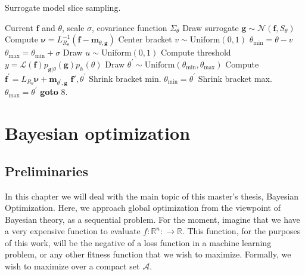\documentclass[10pt,a4paper,twoside]{book}
\begin{document}
\begin{algorithm}
	\caption{Surrogate model slice sampling.}
		\label{mh4alg}
		\begin{algorithmic}[1]
		\Require Current $\boldsymbol{f}$ and $\theta$, scale $\sigma$, covariance function $\Sigma_\theta$ 
		\State Draw surrogate $\boldsymbol{g} \sim \mathcal{N}(\boldsymbol{f}, S_\theta)$
		\State Compute $\boldsymbol{\nu} = L_{R_\theta}^{-1}(\boldsymbol{f} - \boldsymbol{m}_{\theta, \boldsymbol{g}})$
		\State Center bracket $v \sim \mathrm{Uniform}(0, 1)$
		\State $\theta_{\mathrm{min}} = \theta - v$
		\State $\theta_{\mathrm{max}} = \theta_{\mathrm{min}} + \sigma$
		\State Draw $u \sim \mathrm{Uniform}(0, 1)$
		\State Compute threshold $y = \mathcal{L}(\boldsymbol{f})p_{\boldsymbol{g}|\theta}(\boldsymbol{g})p_h(\theta)$
		\State Draw $\theta^{'} \sim \mathrm{Uniform}(\theta_{\mathrm{min}}, \theta_{\mathrm{max}})$
		\State Compute $\boldsymbol{f}^{'} = L_{R_{\theta}}\boldsymbol{\nu} + \boldsymbol{m}_{\theta^{'}, \boldsymbol{g}}$
		\Return $\boldsymbol{f'}, \theta^{'}$
		\State Shrink bracket min. $\theta_{\mathrm{min}} = \theta^{'}$
		\Else
		\State Shrink bracket max. $\theta_{\mathrm{max}} = \theta^{'}$
		\EndIf
		\State \textbf{goto} 8.
		\end{algorithmic}
\end{algorithm}

\printbibliography

\chapter{Bayesian optimization}

\section{Preliminaries}

In this chapter we will deal with the main topic of this master's thesis, Bayesian Optimization. Here, we approach global optimization from the viewpoint of Bayesian theory, as a sequential problem. For the moment, imagine that we have a very expensive function to evaluate $f:\mathbb{R}^n: \rightarrow \mathbb{R}$. This function, for the purposes of this work, will be the negative of a loss function in a machine learning problem, or any other fitness function that we wish to maximize. Formally, we wish to maximize over a compact set $\mathcal{A}$.
\end{document}
